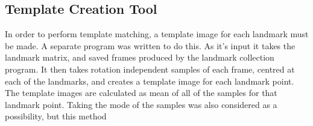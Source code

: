 \documentclass[a4paper, 12pt]{article}
\begin{document}
	\subsection{Template Creation Tool}
	In order to perform template matching, a template image for each landmark must be made.
	A separate program was written to do this.
	As it's input it takes the landmark matrix, and saved frames produced by the landmark collection program.
	It then takes rotation independent samples of each frame, centred at each of the landmarks, and creates
	a template image for each landmark point.
	The template images are calculated as mean of all of the samples for that landmark point.
	Taking the mode of the samples was also considered as a possibility, but this method 
\end{document}
